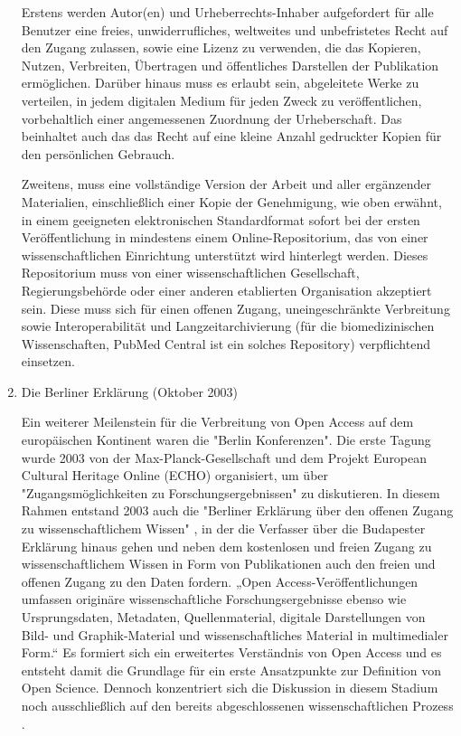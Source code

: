 \begin{enumerate}
Erstens werden Autor(en) und Urheberrechts-Inhaber aufgefordert für alle Benutzer eine freies, unwiderrufliches, weltweites und unbefristetes Recht auf den Zugang zulassen, sowie eine Lizenz zu verwenden, die das Kopieren, Nutzen, Verbreiten, Übertragen und öffentliches Darstellen der Publikation ermöglichen. Darüber hinaus muss es erlaubt sein, abgeleitete Werke zu verteilen, in jedem digitalen Medium für jeden Zweck zu veröffentlichen, vorbehaltlich einer angemessenen Zuordnung der Urheberschaft. Das beinhaltet auch das das Recht auf eine kleine Anzahl gedruckter Kopien für den persönlichen Gebrauch. 

Zweitens, muss eine vollständige Version der Arbeit und aller ergänzender Materialien, einschließlich einer Kopie der Genehmigung, wie oben erwähnt, in einem geeigneten elektronischen Standardformat sofort bei der ersten Veröffentlichung in mindestens einem Online-Repositorium, das von einer wissenschaftlichen Einrichtung unterstützt wird hinterlegt werden. Dieses Repositorium muss von einer wissenschaftlichen Gesellschaft, Regierungsbehörde oder einer anderen etablierten Organisation akzeptiert sein. Diese muss sich für einen offenen Zugang, uneingeschränkte Verbreitung sowie Interoperabilität und Langzeitarchivierung (für die biomedizinischen Wissenschaften, PubMed Central ist ein solches Repository) verpflichtend einsetzen.

\item Die Berliner Erklärung (Oktober 2003)

Ein weiterer Meilenstein für die Verbreitung von Open Access auf dem europäischen Kontinent waren die "Berlin Konferenzen"\cite{CREATe_2014}. Die erste Tagung wurde 2003 von der Max-Planck-Gesellschaft und dem Projekt European Cultural Heritage Online (ECHO) organisiert, um über "Zugangsmöglichkeiten zu Forschungsergebnissen" zu diskutieren. In diesem Rahmen entstand 2003 auch die "Berliner Erklärung über den offenen Zugang zu wissenschaftlichem Wissen" \cite{berliner_erklaerung_2003}, in der die Verfasser über die Budapester Erklärung hinaus gehen und neben dem kostenlosen und freien Zugang zu wissenschaftlichem Wissen in Form von Publikationen auch den freien und offenen Zugang zu den Daten fordern. „Open Access-Veröffentlichungen umfassen originäre wissenschaftliche Forschungsergebnisse ebenso wie Ursprungsdaten, Metadaten, Quellenmaterial, digitale Darstellungen von Bild- und Graphik-Material und wissenschaftliches Material in multimedialer Form.“ \cite{berliner_erklaerung_2003} Es formiert sich ein erweitertes Verständnis von Open Access und es entsteht damit die Grundlage für ein erste Ansatzpunkte zur Definition von Open Science. Dennoch konzentriert sich die Diskussion in diesem Stadium noch ausschließlich auf den bereits abgeschlossenen wissenschaftlichen Prozess \cite{suchen}.

\end{enumerate}

